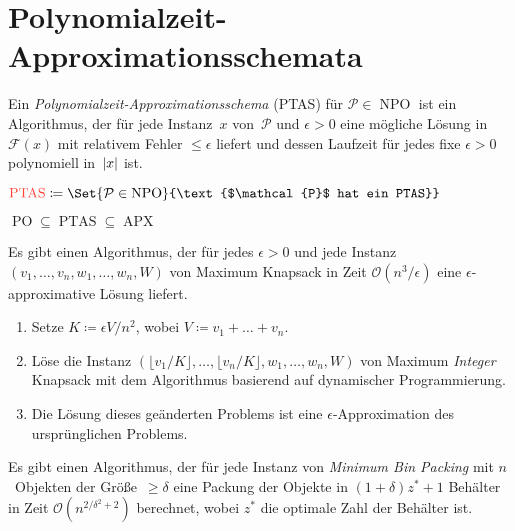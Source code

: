 \documentclass{cheat-sheet}
\newcommand{\Feasible}{\mathcal{F}} %
\newcommand{\size}[1]{\abs{#1}} %
\DeclareMathOperator{\NPO}{NPO} %
\DeclareMathOperator{\PO}{PO} %
\DeclareMathOperator{\APX}{APX} %
\DeclareMathOperator{\PTAS}{PTAS} %
\newcommand{\Prob}{\mathcal{P}} %
\renewcommand{\O}{\mathcal{O}} %
\newcommand{\floor}[1]{\lfloor #1 \rfloor} %
\newcommand{\Defn}[1]{\textcolor{DefinitionColor}{#1}}
\begin{document}
\section{Polynomialzeit-Approximationsschemata}

\begin{defn}
  Ein \emph{Polynomialzeit-Approximationsschema} (PTAS) für $\Prob \in \NPO$ ist ein Algorithmus, der für jede Instanz~$x$ von~$\Prob$ und $\epsilon > 0$ eine mögliche Lösung in~$\Feasible(x)$ mit relativem Fehler $\leq \epsilon$ liefert und dessen Laufzeit für jedes fixe $\epsilon > 0$ polynomiell in~$\size{x}$ ist.
\end{defn}

\begin{defn}
  $\Defn{\PTAS} \coloneqq \Set{\Prob \in \NPO}{\text{$\Prob$ hat ein PTAS}}$
\end{defn}

\begin{bem}
  $\PO \subseteq \PTAS \subseteq \APX$
\end{bem}

\begin{satz}
  Es gibt einen Algorithmus, der für jedes $\epsilon > 0$ und jede Instanz $(v_1, \ldots, v_n, w_1, \ldots, w_n, W)$ von Maximum Knapsack in Zeit $\O(n^3 / \epsilon)$ eine $\epsilon$-approximative Lösung liefert.
\end{satz}

\begin{alg}
  \begin{enumerate}
    \item Setze $K \coloneqq \epsilon V / n^2$, wobei $V \coloneqq v_1 + \ldots + v_n$.
    \item Löse die Instanz $(\floor{v_1/K}, \ldots, \floor{v_n/K}, w_1, \ldots, w_n, W)$ von Maximum \textit{Integer} Knapsack mit dem Algorithmus basierend auf dynamischer Programmierung.
    \item Die Lösung dieses geänderten Problems ist eine $\epsilon$-Approximation des ursprünglichen Problems.
  \end{enumerate}
\end{alg}

\begin{lem}
  Es gibt einen Algorithmus, der für jede Instanz von \textit{Minimum Bin Packing} mit $n$~Objekten der Größe~$\geq \delta$ eine Packung der Objekte in $(1 + \delta) z^* + 1$ Behälter in Zeit $\O(n^{2/\delta^2 + 2})$ berechnet, wobei $z^*$ die optimale Zahl der Behälter ist.
\end{lem}
\end{document}
